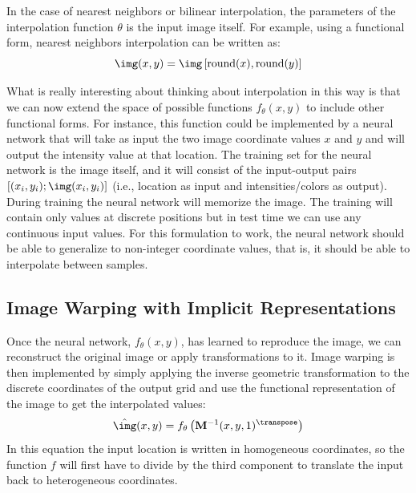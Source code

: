 In the case of nearest neighbors or bilinear interpolation, the parameters of the interpolation function $\theta$ is the input image itself. For example, using a functional form, nearest neighbors interpolation can be written as:
\begin{equation}
   \img (x,y) = \img \left[ \text{round}(x), \text{round}(y) \right]
\end{equation}

What is really interesting about thinking about interpolation in this way is that we can now extend the space of possible functions $f_{\theta}(x,y)$ to include other functional forms. For instance, this function could be implemented by a neural network that will take as input the two image coordinate values $x$ and $y$ and will output the intensity value at that location. The training set for the neural network is the image itself, and it will consist of the input-output pairs $[(x_i, y_i); \img(x_i,y_i)]$ (i.e., location as input and intensities/colors as output). During training the neural network will memorize the image. The training will contain only values at discrete positions but in test time we can use any continuous input values. For this formulation to work, the neural network should be able to generalize to non-integer coordinate values, that is, it should be able to interpolate between samples. 

\subsection{Image Warping with Implicit Representations}

Once the neural network, $f_{\theta}(x,y)$, has learned to reproduce the image, we can reconstruct the original image or apply transformations to it. Image warping is then implemented by simply applying the inverse geometric transformation to the discrete coordinates of the output grid and use the functional representation of the image to get the interpolated values:
\begin{equation}
   \hat{\img} (x,y) = f_{\theta} \left( \mathbf{M}^{-1}(x,y,1)^\transpose \right)
\end{equation}
In this equation the input location is written in homogeneous coordinates, so the function $f$ will first have to divide by the third component to translate the input back to heterogeneous coordinates. 

